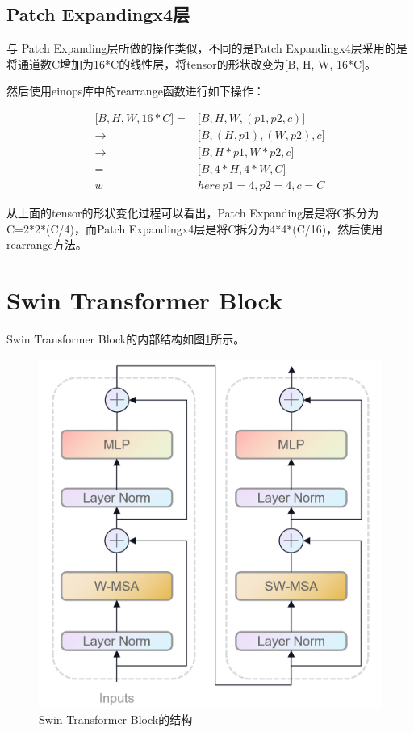 \subsection{Patch Expandingx4层}
 与 Patch Expanding层所做的操作类似，不同的是Patch Expandingx4层采用的是将通道数C增加为16*C的线性层，将tensor的形状改变为[B, H, W, 16*C]。
 
 然后使用einops库中的rearrange函数进行如下操作：
 
 \begin{equation} \label{502}
 	\begin{aligned}
 		\Big [ B, H, W, 16*C \Big ] = & \Big [B, H, W, (p1, p2, c) \Big ]\\ 
 		\rightarrow & \Big [  B, (H, p1), (W, p2), c \Big ] \\
 		\rightarrow & \Big [ B, H*p1, W*p2, c \Big ] \\  = &\Big [ B, 4*H, 4*W, C \Big ] \\ 
 		w&here \  p1=4, p2=4, c=C
 	\end{aligned}
 \end{equation}
 
 从上面的tensor的形状变化过程可以看出，Patch Expanding层是将C拆分为C=2*2*(C/4)，而Patch Expandingx4层是将C拆分为4*4*(C/16)，然后使用rearrange方法。

\section{Swin Transformer Block}
Swin Transformer Block的内部结构如图\ref{img504}所示。

\begin{figure}[h]
	\centering
	\includegraphics[width=0.65\columnwidth]{image/chap05/img504.png}
	\caption{Swin Transformer Block的结构}
	\label{img504}
\end{figure}

